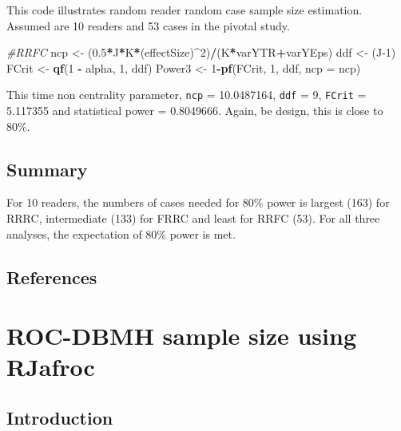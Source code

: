 \documentclass[]{book}
\newenvironment{Shaded}{\begin{snugshade}}{\end{snugshade}}
\newcommand{\CommentTok}[1]{\textcolor[rgb]{0.56,0.35,0.01}{\textit{#1}}}
\newcommand{\DataTypeTok}[1]{\textcolor[rgb]{0.13,0.29,0.53}{#1}}
\newcommand{\DecValTok}[1]{\textcolor[rgb]{0.00,0.00,0.81}{#1}}
\newcommand{\FloatTok}[1]{\textcolor[rgb]{0.00,0.00,0.81}{#1}}
\newcommand{\KeywordTok}[1]{\textcolor[rgb]{0.13,0.29,0.53}{\textbf{#1}}}
\newcommand{\NormalTok}[1]{#1}
\newcommand{\OperatorTok}[1]{\textcolor[rgb]{0.81,0.36,0.00}{\textbf{#1}}}
\newcommand{\StringTok}[1]{\textcolor[rgb]{0.31,0.60,0.02}{#1}}
\begin{document}
This code illustrates random reader random case sample size estimation. Assumed are 10 readers and 53 cases in the pivotal study.

\begin{Shaded}
\begin{Highlighting}[]
\CommentTok{#RRFC}
\NormalTok{ncp <-}\StringTok{ }\NormalTok{(}\FloatTok{0.5}\OperatorTok{*}\NormalTok{J}\OperatorTok{*}\NormalTok{K}\OperatorTok{*}\NormalTok{(effectSize)}\OperatorTok{^}\DecValTok{2}\NormalTok{)}\OperatorTok{/}\NormalTok{(K}\OperatorTok{*}\NormalTok{varYTR}\OperatorTok{+}\NormalTok{varYEps)}
\NormalTok{ddf <-}\StringTok{ }\NormalTok{(J}\DecValTok{-1}\NormalTok{)}
\NormalTok{FCrit <-}\StringTok{ }\KeywordTok{qf}\NormalTok{(}\DecValTok{1} \OperatorTok{-}\StringTok{ }\NormalTok{alpha, }\DecValTok{1}\NormalTok{, ddf)}
\NormalTok{Power3 <-}\StringTok{ }\DecValTok{1}\OperatorTok{-}\KeywordTok{pf}\NormalTok{(FCrit, }\DecValTok{1}\NormalTok{, ddf, }\DataTypeTok{ncp =}\NormalTok{ ncp)}
\end{Highlighting}
\end{Shaded}

This time non centrality parameter, \texttt{ncp} = 10.0487164, \texttt{ddf} = 9, \texttt{FCrit} = 5.117355 and statistical power = 0.8049666. Again, be design, this is close to 80\%.

\hypertarget{summary-5}{%
\section{Summary}\label{summary-5}}

For 10 readers, the numbers of cases needed for 80\% power is largest (163) for RRRC, intermediate (133) for FRRC and least for RRFC (53). For all three analyses, the expectation of 80\% power is met.

\hypertarget{references-7}{%
\section{References}\label{references-7}}

\hypertarget{SSRocDBMHRJafroc}{%
\chapter{ROC-DBMH sample size using RJafroc}\label{SSRocDBMHRJafroc}}

\hypertarget{introduction-8}{%
\section{Introduction}\label{introduction-8}}
\end{document}
